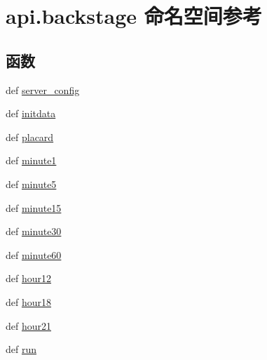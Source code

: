 \hypertarget{namespaceapi_1_1backstage}{\section{api.\-backstage 命名空间参考}
\label{namespaceapi_1_1backstage}
}
\subsection*{函数}
\begin{DoxyCompactItemize}
\item 
def \hyperlink{namespaceapi_1_1backstage_a89efb5c1143f5bd19b57f5ac245f23b2}{server\-\_\-config}
\item 
def \hyperlink{namespaceapi_1_1backstage_a1e86601ed3a5de440d11788ec5094f4a}{initdata}
\item 
def \hyperlink{namespaceapi_1_1backstage_aac12e9bf2bd5bf6bebf7b1160b8855fd}{placard}
\item 
def \hyperlink{namespaceapi_1_1backstage_a13241ba3eef54a3c785829fbe1948f83}{minute1}
\item 
def \hyperlink{namespaceapi_1_1backstage_a53d82c1da8726fbc55ecb497d102ed95}{minute5}
\item 
def \hyperlink{namespaceapi_1_1backstage_abeb8a1b4e59c5da4d0d93161e1e522d5}{minute15}
\item 
def \hyperlink{namespaceapi_1_1backstage_af5ac0735cdff8791e471befd66716bd8}{minute30}
\item 
def \hyperlink{namespaceapi_1_1backstage_ac4cea46b7b6909fef2f03481032b8751}{minute60}
\item 
def \hyperlink{namespaceapi_1_1backstage_a2ee8ef65509ba7ad29fcd8557fcef234}{hour12}
\item 
def \hyperlink{namespaceapi_1_1backstage_a376c7645901135d03081cb762b013c06}{hour18}
\item 
def \hyperlink{namespaceapi_1_1backstage_a0fdaf889141a34070538b5181f5da2c5}{hour21}
\item 
def \hyperlink{namespaceapi_1_1backstage_adadc318e98fee5655a8526de61de6cb1}{run}
\end{DoxyCompactItemize}
